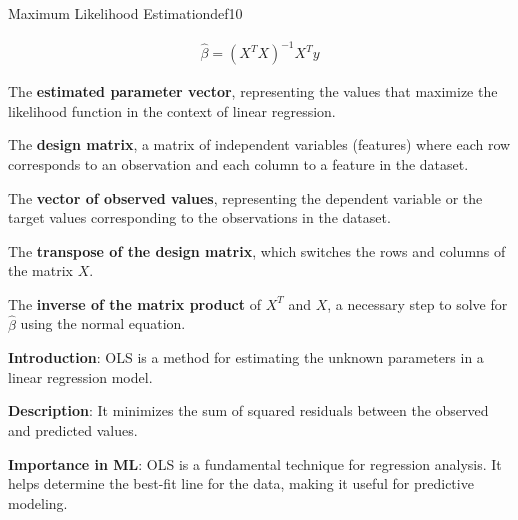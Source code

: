 \documentclass[
  12 pt,
  a4paper,
]{book}
\numberwithin{equation}{section}
\theoremstyle{plain}      %
\theoremstyle{definition} %
\theoremstyle{remark}     %
\theoremstyle{note}         %
\begin{document}
\begin{a_def_eq}{Maximum Likelihood Estimation}{def10} 

\begin{align} 
\hat{\beta} = (X^T X)^{-1} X^T y 
\end{align}

\begin{description}[align=left, labelwidth=2cm, labelsep=0em, leftmargin=2cm]
    \item[$\hat{\beta}$] The \textbf{estimated parameter vector}, representing the values that maximize the likelihood function in the context of linear regression.
    \vspace{0.5\baselineskip}
    \item[$X$] The \textbf{design matrix}, a matrix of independent variables (features) where each row corresponds to an observation and each column to a feature in the dataset.
    \vspace{0.5\baselineskip}
    \item[$y$] The \textbf{vector of observed values}, representing the dependent variable or the target values corresponding to the observations in the dataset.
    \vspace{0.5\baselineskip}
    \item[$X^T$] The \textbf{transpose of the design matrix}, which switches the rows and columns of the matrix $X$.
    \vspace{0.5\baselineskip}
    \item[$(X^T X)^{-1}$] The \textbf{inverse of the matrix product} of $X^T$ and $X$, a necessary step to solve for $\hat{\beta}$ using the normal equation.
    \vspace{0.5\baselineskip}
\end{description}

\end{a_def_eq}

\hfill\break

\textbf{Introduction}: OLS is a method for estimating the unknown
parameters in a linear regression model.

\textbf{Description}: It minimizes the sum of squared residuals between
the observed and predicted values.

\textbf{Importance in ML}: OLS is a fundamental technique for regression
analysis. It helps determine the best-fit line for the data, making it
useful for predictive modeling. \vspace*{\fill}

\newpage
\end{document}
